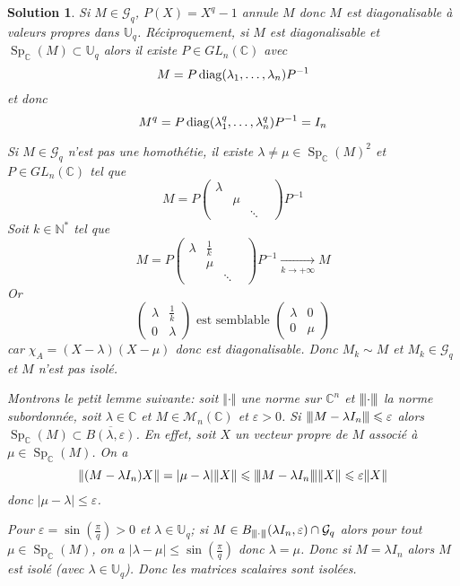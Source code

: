 \documentclass[12pt]{article}
\newtheorem{solution}{Solution}[section]
\theoremstyle{remark}
\newcommand{\C}{\mathbb{C}} \newcommand{\Q}{\mathbb{Q}}
\newcommand{\N}{\mathbb{N}} \newcommand{\Z}{\mathbb{Z}}
\newcommand{\U}{\mathbb{U}} \newcommand{\E}{\mathbb{E}}
\newcommand{\M}{\mathcal{M}} \renewcommand{\L}{\mathcal{L}}
\DeclareMathOperator{\Sp}{Sp} \DeclareMathOperator{\mat}{mat}
\newcommand{\vertiii}[1]{{\left\vert\kern-0.25ex\left\vert\kern-0.25ex\left\vert{}#1
\right\vert\kern-0.25ex\right\vert\kern-0.25ex\right\vert}}
\numberwithin{equation}{section}
\begin{document}
\begin{solution}
	Si $M\in\mathcal{G}_{q}$, $P(X)=X^{q}-1$ annule $M$ donc $M$ est diagonalisable à valeurs propres dans $\U_{q}$. Réciproquement, si $M$ est diagonalisable et $\Sp_{\C}(M)\subset\U_{q}$ alors il existe $P\in GL_{n}(\C)$ avec 
	$$M=P\operatorname{diag}(\lambda_{1},\dots,\lambda_{n})P^{-1}$$
	et donc 
	$$M^{q}=P\operatorname{diag}(\lambda_{1}^{q},\dots,\lambda_{n}^{q})P^{-1}=I_{n}$$

	Si $M\in\mathcal{G}_{q}$ n'est pas une homothétie, il existe $\lambda\neq\mu\in\Sp_{\C}(M)^{2}$ et $P\in GL_{n}(\C)$ tel que 
	$$M=P\begin{pmatrix}
		\lambda & &\\
		& \mu & &\\
		& & \ddots
	\end{pmatrix}P^{-1}$$
	Soit $k\in\N^{*}$ tel que 
	$$M=P\begin{pmatrix}
		\lambda & \frac{1}{k}&\\
		& \mu & &\\
		& & \ddots
	\end{pmatrix}P^{-1}\xrightarrow[k\to+\infty]{}M$$
	Or 
	$$\begin{pmatrix}
		\lambda & \frac{1}{k}\\
		0 & \lambda
	\end{pmatrix}\text{  est semblable }\begin{pmatrix}
		\lambda & 0\\
		0 & \mu
	\end{pmatrix}$$
	car $\chi_{A}=(X-\lambda)(X-\mu)$ donc est diagonalisable. Donc $M_{k}\sim M$ et $M_{k}\in\mathcal{G}_{q}$ et $M$ n'est pas isolé.

	Montrons le petit lemme suivante: soit $\Vert\cdot\Vert$ une norme sur $\C^{n}$ et $\vertiii{\cdot}$ la norme subordonnée, soit $\lambda\in\C$ et $M\in\M_{n}(\C)$ et $\varepsilon>0$. Si $\vertiii{M-\lambda I_{n}}\leqslant\varepsilon$ alors $\Sp_{\C}(M)\subset\overline{B(\lambda,\varepsilon)}$. En effet, soit $X$ un vecteur propre de $M$ associé à $\mu\in\Sp_{\C}(M)$. On a 
	$$\Vert (M-\lambda I_{n})X\Vert=\vert\mu-\lambda \vert \Vert X\Vert\leqslant\vertiii{M-\lambda I_{n}}\Vert X\Vert\leqslant\varepsilon\Vert X\Vert$$
	donc $\vert\mu-\lambda\vert\leqslant\varepsilon$.

	Pour $\varepsilon=\sin(\frac{\pi}{q})>0$ et $\lambda\in\U_{q}$; si $M\in B_{\vertiii{\cdot}}(\lambda I_{n},\varepsilon)\cap \mathcal{G}_{q}$ alors pour tout $\mu\in\Sp_{\C}(M)$, on a $\vert\lambda-\mu\vert\leqslant\sin(\frac{\pi}{q})$ donc $\lambda=\mu$. Donc si $M=\lambda I_{n}$
	 alors $M$ est isolé (avec $\lambda\in\U_{q}$). Donc les matrices scalaires sont isolées.
\end{solution}
\end{document}
